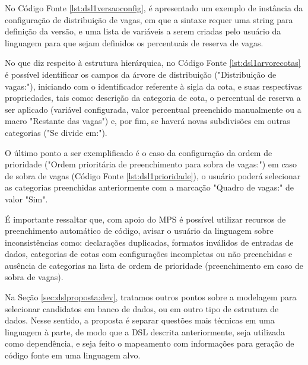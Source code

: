    No Código Fonte \ref{lst:dsl1versaoconfig}, é apresentado um exemplo de instância da configuração de distribuição de vagas, em que a sintaxe requer uma string para definição da versão, e uma lista de variáveis a serem criadas pelo usuário da linguagem para que sejam definidos os percentuais de reserva de vagas.
   
   


No que diz respeito à estrutura hierárquica, no Código Fonte \ref{lst:dsl1arvorecotas} é possível identificar os campos da árvore de distribuição ("Distribuição de vagas:"), iniciando com o identificador referente à sigla da cota, e suas respectivas propriedades, tais como: descrição da categoria de cota, o percentual de reserva a ser aplicado (variável configurada, valor percentual preenchido manualmente ou a macro "Restante das vagas") e, por fim, se haverá novas subdivisões em outras categorias ("Se divide em:").

   


O último ponto a ser exemplificado é o caso da configuração da ordem de prioridade ("Ordem prioritária de preenchimento para sobra de vagas:") em caso de sobra de vagas (Código Fonte \ref{lst:dsl1prioridade}), o usuário poderá selecionar as categorias preenchidas anteriormente com a marcação "Quadro de vagas:" de valor "Sim".  

   

É importante ressaltar que, com apoio do \gls{MPS} é possível utilizar recursos de preenchimento automático de código, avisar o usuário da linguagem sobre inconsistências como: declarações duplicadas, formatos inválidos de entradas de dados, categorias de cotas com configurações incompletas ou não preenchidas e ausência de categorias na lista de ordem de prioridade (preenchimento em caso de sobra de vagas). 

Na Seção \ref{sec:dslproposta:dev}, tratamos outros pontos sobre a modelagem para selecionar candidatos em banco de dados, ou em outro tipo de estrutura de dados. Nesse sentido, a proposta é separar questões mais técnicas em uma linguagem à parte, de modo que a \gls{DSL} descrita anteriormente, seja utilizada como dependência, e seja feito o mapeamento com informações para geração de código fonte em uma linguagem alvo.